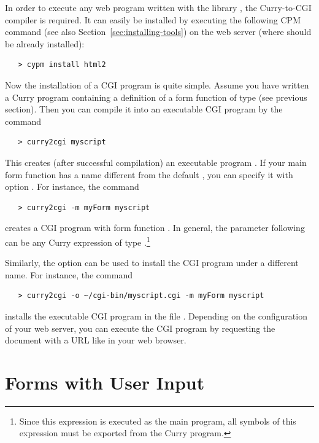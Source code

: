 In order to execute any web program written with the
library , the Curry-to-CGI compiler
 is required.
It can easily be installed by executing
the following CPM command (see also Section~\ref{sec:installing-tools})
on the web server (where \pakcs should be already installed):
%
\begin{verbatim}
   > cypm install html2
\end{verbatim}
%
Now the installation of a CGI program is quite simple.
Assume you have written a Curry program 
containing a definition of a form function 
of type  (see previous section).
Then you can compile it into an executable CGI program
by the command
%
\begin{verbatim}
   > curry2cgi myscript
\end{verbatim}
%
This creates (after successful compilation) an executable program
.
If your main form function has a name different from the default ,
you can specify it with option .
For instance, the command
%
\begin{verbatim}
   > curry2cgi -m myForm myscript
\end{verbatim}
%
creates a CGI program with form function .
In general, the parameter following  can be any Curry expression
of type .\footnote{%
Since this expression is executed as the main program,
all symbols of this expression must be exported from the
Curry program.}

Similarly, the option  can be used to install the CGI program
under a different name. For instance, the command
%
\begin{verbatim}
   > curry2cgi -o ~/cgi-bin/myscript.cgi -m myForm myscript
\end{verbatim}
%
installs the executable CGI program
in the file .
Depending on the configuration of your web server,
you can execute the CGI program by requesting the
document with a URL like
in your web browser.


\section{Forms with User Input}
\label{sec-html-forms}


